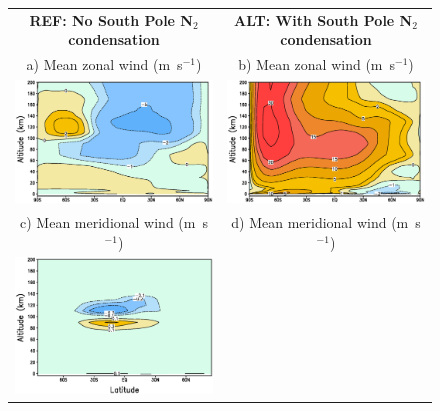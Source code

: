 \begin{figure}
  \begin{center}
\renewcommand{\arraystretch}{0.2}
\begin{tabular}[h]{cc}
\hspace{-2.cm}
   {\bf REF: No South Pole N$_2$ condensation} & {\bf ALT: With South Pole N$_2$ condensation} \\
\hspace{-2.cm}
   {a) Mean zonal wind (m~s$^{-1}$) } & {b) Mean zonal wind (m~s$^{-1}$) } \\
\hspace{-2.cm}
   \includegraphics[width=8.cm,angle=-0,clip]{figures/sectionU.eps} &
   \includegraphics[width=8.cm,angle=-0,clip]{figures/sectionU_pole.eps} \\
\hspace{-2.cm}
   {c) Mean meridional wind (m~s$^{-1}$) } & {d) Mean meridional wind (m~s$^{-1}$) } \\
\hspace{-2.cm}
   \includegraphics[width=8.cm,angle=-0,clip]{figures/sectionV.eps} &

\end{tabular}
\end{center}
\end{figure}
